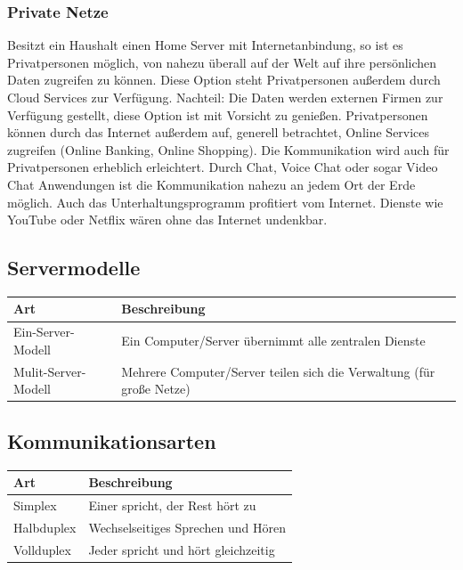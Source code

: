 \documentclass[12pt,a4paper]{article}
\begin{document}
\subsubsection{Private Netze}
    Besitzt ein Haushalt einen Home Server mit Internetanbindung, so ist es Privatpersonen möglich, von nahezu überall auf der Welt auf ihre persönlichen Daten zugreifen zu können. Diese Option steht Privatpersonen außerdem durch Cloud Services zur Verfügung. Nachteil: Die Daten werden externen Firmen zur Verfügung gestellt, diese Option ist mit Vorsicht zu genießen. Privatpersonen können durch das Internet außerdem auf, generell betrachtet, Online Services zugreifen (Online Banking, Online Shopping). Die Kommunikation wird auch für Privatpersonen erheblich erleichtert. Durch Chat, Voice Chat oder sogar Video Chat Anwendungen ist die Kommunikation nahezu an jedem Ort der Erde möglich. Auch das Unterhaltungsprogramm profitiert vom Internet. Dienste wie YouTube oder Netflix wären ohne das Internet undenkbar.

\subsection{Servermodelle}
\begin{table}[h]
	\renewcommand{\arraystretch}{1.5}	
	\centering
		\begin{tabularx}{17cm}{|X|X|}
			\hline
			\cellcolor{cyan!60!white}Art&\cellcolor{cyan!60!white}Beschreibung\\
			\hline
			Ein-Server-Modell&Ein Computer/Server übernimmt alle zentralen Dienste \\
			\hline
			Mulit-Server-Modell&Mehrere Computer/Server teilen sich die Verwaltung (für große Netze) \\
			\hline
		\end{tabularx}
\end{table}

\subsection{Kommunikationsarten}
\begin{table}[h]
	\renewcommand{\arraystretch}{1.5}	
	\centering
		\begin{tabularx}{17cm}{|X|X|}
			\hline
			\cellcolor{cyan!60!white}Art&\cellcolor{cyan!60!white}Beschreibung\\
			\hline
			Simplex&Einer spricht, der Rest hört zu \\
			\hline
			Halbduplex&Wechselseitiges Sprechen und Hören \\
			\hline
			Vollduplex& Jeder spricht und hört gleichzeitig \\
			\hline
		\end{tabularx}
\end{table}
\end{document}
